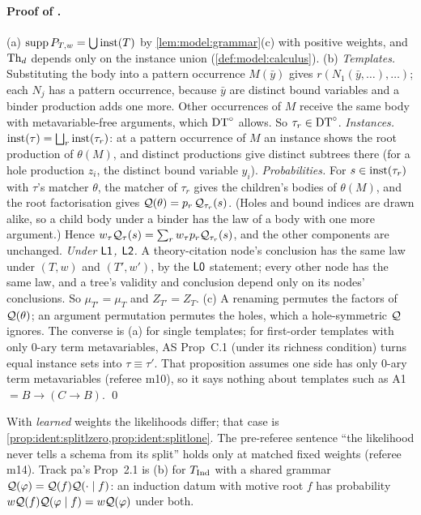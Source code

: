 \paragraph{Proof of .}
(a) $\operatorname{supp}P_{T,w}=\bigcup\mathrm{inst}(T)$ by \cref{lem:model:grammar}(c) with positive weights, and $\mathrm{Th}_d$ depends only on the instance union (\cref{def:model:calculus}).
(b) \emph{Templates.} Substituting the body into a pattern occurrence $M(\bar y)$ gives $r(N_1(\bar y,\dots),\dots)$; each $N_j$ has a pattern occurrence, because $\bar y$ are distinct bound variables and a binder production adds one more. Other occurrences of $M$ receive the same body with metavariable-free arguments, which $\mathrm{DT}^{\circ}$ allows. So $\tau_r\in\mathrm{DT}^{\circ}$.
\emph{Instances.} $\mathrm{inst}(\tau)=\bigsqcup_r\mathrm{inst}(\tau_r)$: at a pattern occurrence of $M$ an instance shows the root production of $\theta(M)$, and distinct productions give distinct subtrees there (for a hole production $z_i$, the distinct bound variable $y_i$).
\emph{Probabilities.} For $s\in\mathrm{inst}(\tau_r)$ with $\tau$'s matcher $\theta$, the matcher of $\tau_r$ gives the children's bodies of $\theta(M)$, and the root factorisation gives $\mathcal{Q}(\theta)=p_r\,\mathcal{Q}_{\tau_r}(s)$. (Holes and bound indices are drawn alike, so a child body under a binder has the law of a body with one more argument.) Hence $w_\tau\mathcal{Q}_\tau(s)=\sum_rw_\tau p_r\mathcal{Q}_{\tau_r}(s)$, and the other components are unchanged.
\emph{Under $\mathord{\mathsf{L1}}$, $\mathord{\mathsf{L2}}$.} A theory-citation node's conclusion has the same law under $(T,w)$ and $(T',w')$, by the $\mathord{\mathsf{L0}}$ statement; every other node has the same law, and a tree's validity and conclusion depend only on its nodes' conclusions. So $\mu_{T'}=\mu_T$ and $Z_{T'}=Z_T$.
(c) A renaming permutes the factors of $\mathcal{Q}(\theta)$; an argument permutation permutes the holes, which a hole-symmetric $\mathcal{Q}$ ignores. The converse is (a) for single templates; for first-order templates with only $0$-ary term metavariables, AS Prop~C.1 (under its richness condition) turns equal instance sets into $\tau\equiv\tau'$. That proposition assumes one side has only $0$-ary term metavariables (referee m10), so it says nothing about templates such as A1 $=B\to(C\to B)$. \qed

With \emph{learned} weights the likelihoods differ; that case is \cref{prop:ident:splitlzero,prop:ident:splitlone}. The pre-referee sentence ``the likelihood never tells a schema from its split'' holds only at matched fixed weights (referee m14). Track pa's Prop~2.1 is (b) for $T_{\mathrm{Ind}}$ with a shared grammar $\mathcal{Q}(\varphi)=\mathcal{Q}(f)\mathcal{Q}(\cdot\mid f)$: an induction datum with motive root $f$ has probability $w\mathcal{Q}(f)\mathcal{Q}(\varphi\mid f)=w\mathcal{Q}(\varphi)$ under both.

